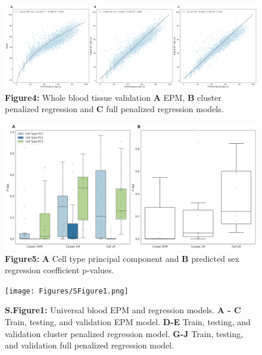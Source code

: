 \documentclass{article}
\begin{document}
{\begin{raggedleft}
\begin{figure}
\includegraphics[scale=.18]{Figures/Figure4.png}
\footnotesize
\caption*{\small \textbf{Figure4: }Whole blood tissue validation \textbf{A} EPM, \textbf{B} cluster penalized 
regression and \textbf{C} full penalized regression models.}
\end{figure}
\end{raggedleft}

\begin{center}
    \begin{figure}
    \includegraphics[scale=.25]{Figures/Figure5.png}
    \footnotesize
    \caption*{\small \textbf{Figure5: }\textbf{A} Cell type principal component and \textbf{B} predicted sex 
    regression coefficient p-values.
    }
    \end{figure}
\end{center}

\begin{raggedleft}
\begin{figure}
\texttt{[image: Figures/SFigure1.png]}    
\footnotesize
\caption*{\small \textbf{S.Figure1: }Universal blood EPM and regression models. \textbf{A - C} Train, testing, and 
validation EPM model. \textbf{D-E}  Train, testing, and validation cluster penalized regression model. 
\textbf{G-J} Train, testing, and validation full penalized regression model.}
\end{figure}
\end{raggedleft}

}
\end{document}
